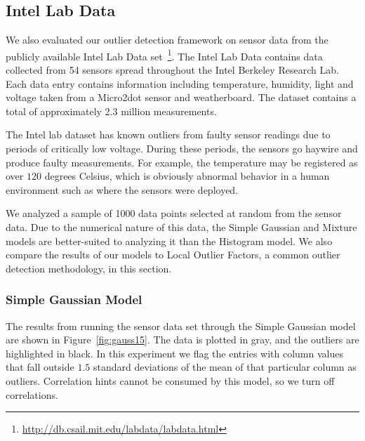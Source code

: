\subsection{Intel Lab Data}
\label{sec:intel-lab-data-evaluation}

We also evaluated our outlier detection framework on sensor data from the publicly available Intel Lab Data set~\footnote{\url{http://db.csail.mit.edu/labdata/labdata.html}}. The Intel Lab Data contains data collected from 54 sensors spread throughout the Intel Berkeley Research Lab. Each data entry contains information including temperature, humidity, light and voltage taken from a Micro2dot sensor and weatherboard. The dataset contains a total of approximately 2.3 million measurements.

The Intel lab dataset has known outliers from faulty sensor readings due to periods of critically low voltage. During these periods, the sensors go haywire and produce faulty measurements.
For example, the temperature may be registered as over $120$ degrees Celsius, which is obviously abnormal behavior in a human environment such as where the sensors were deployed.
 
We analyzed a sample of 1000 data points selected at random from the sensor data. 
Due to the numerical nature of this data, the Simple Gaussian and Mixture models are better-suited to analyzing it than the Histogram model.
We also compare the results of our models to Local Outlier Factors, a common outlier detection methodology, in this section.
 
\subsubsection{Simple Gaussian Model}

The results from running the sensor data set through the Simple Gaussian model are shown in Figure~\ref{fig:gauss15}.
The data is plotted in gray, and the outliers are highlighted in black.
In this experiment we flag the entries with column values that fall outside $1.5$ standard deviations of the mean of that particular column as outliers.
Correlation hints cannot be consumed by this model, so we turn off correlations.



